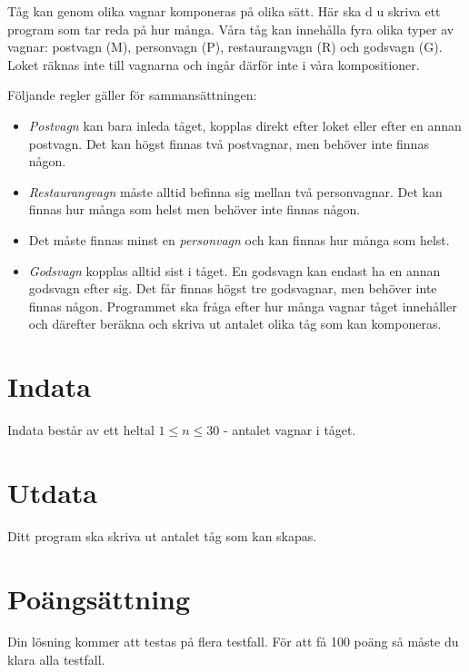 
Tåg kan genom olika vagnar komponeras på olika sätt. Här ska d u skriva ett program som tar reda på hur många. Våra tåg kan innehålla fyra olika typer av vagnar: postvagn (M), personvagn (P), restaurangvagn (R) och godsvagn (G). Loket räknas inte till vagnarna och ingår därför inte i våra kompositioner.

Följande regler gäller för sammansättningen:
\begin{itemize}
\item \emph{Postvagn} kan bara inleda tåget, kopplas direkt efter loket eller efter en annan postvagn. Det kan högst finnas två postvagnar, men behöver inte finnas någon.
\item \emph{Restaurangvagn} måste alltid befinna sig mellan två personvagnar. Det kan finnas hur många som helst men behöver inte finnas någon. 	
\item Det måste finnas minst en \emph{personvagn} och kan finnas hur många som helst.
\item \emph{Godsvagn} kopplas alltid sist i tåget. En godsvagn kan endast ha en annan godsvagn efter sig. Det får finnas högst tre godsvagnar, men behöver inte finnas någon. Programmet ska fråga efter hur många vagnar tåget innehåller och därefter beräkna och skriva ut antalet olika tåg som kan komponeras. 
\end{itemize}

\section*{Indata}
Indata består av ett heltal $1 \le n \le 30$ - antalet vagnar i tåget.

\section*{Utdata}
Ditt program ska skriva ut antalet tåg som kan skapas.


\section*{Poängsättning}
Din lösning kommer att testas på flera testfall. För att få 100 poäng så måste du klara alla testfall.
